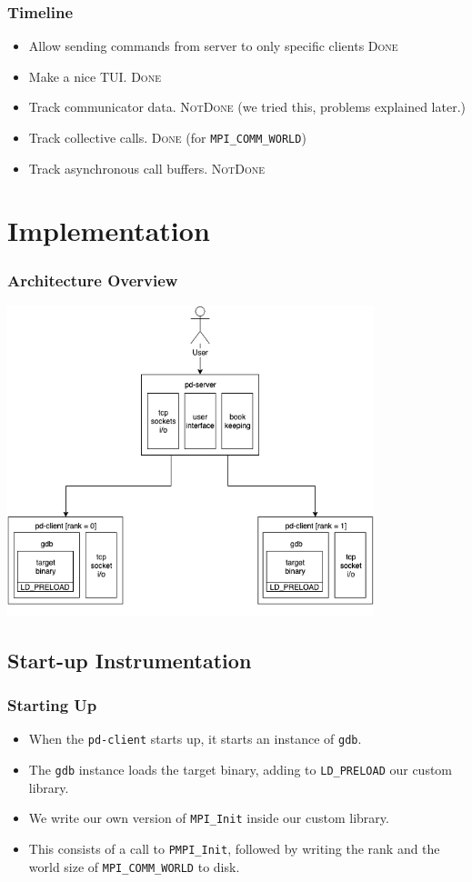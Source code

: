 \documentclass{beamer}
\begin{document}
\begin{frame}
  \frametitle{Timeline}
  \begin{itemize}
  \item <1-> Allow sending commands from server to only specific clients \textsc{\color{green} Done}
  \item <2-> Make a nice TUI. \textsc{\color{green} Done}
  \item <3-> Track communicator data. \textsc{\color{red} NotDone} (we tried this, problems explained later.)
  \item <4-> Track collective calls. \textsc{\color{green} Done} (for \texttt{MPI\_COMM\_WORLD})
  \item <5-> Track asynchronous call buffers. \textsc{\color{red} NotDone}
  \end{itemize}
\end{frame}

\section{Implementation}
\begin{frame}
  \frametitle{Architecture Overview}
  \centering
  \includegraphics[width=0.8\textwidth]{overview}
\end{frame}

\subsection{Start-up Instrumentation}

\begin{frame}
  \frametitle{Starting Up}
  \begin{itemize}
  \item <1-> When the \texttt{pd-client} starts up, it starts an instance of \texttt{gdb}.
  \item <2-> The \texttt{gdb} instance loads the target binary, adding to \texttt{LD\_PRELOAD} our custom library.
 \item <3-> We write our own version of \texttt{MPI\_Init} inside our custom library.
 \item <4-> This consists of a call to \texttt{PMPI\_Init}, followed by writing the rank and the world size of \texttt{MPI\_COMM\_WORLD} to disk.
 \end{itemize}
\end{frame}
\end{document}
